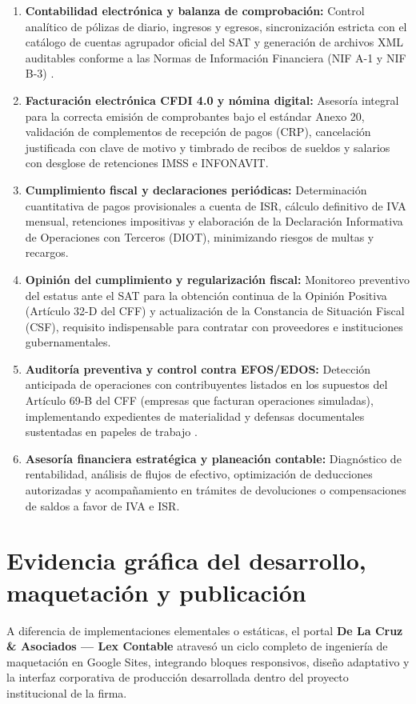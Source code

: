 {\begin{enumerate}
\item \textbf{Contabilidad electrónica y balanza de comprobación:} Control analítico de pólizas de diario, ingresos y egresos, sincronización estricta con el catálogo de cuentas agrupador oficial del SAT y generación de archivos XML auditables conforme a las Normas de Información Financiera (NIF A-1 y NIF B-3) \parencite{satPortalContabilidad}.
\item \textbf{Facturación electrónica CFDI 4.0 y nómina digital:} Asesoría integral para la correcta emisión de comprobantes bajo el estándar Anexo 20, validación de complementos de recepción de pagos (CRP), cancelación justificada con clave de motivo y timbrado de recibos de sueldos y salarios con desglose de retenciones IMSS e INFONAVIT.
\item \textbf{Cumplimiento fiscal y declaraciones periódicas:} Determinación cuantitativa de pagos provisionales a cuenta de ISR, cálculo definitivo de IVA mensual, retenciones impositivas y elaboración de la Declaración Informativa de Operaciones con Terceros (DIOT), minimizando riesgos de multas y recargos.
\item \textbf{Opinión del cumplimiento y regularización fiscal:} Monitoreo preventivo del estatus ante el SAT para la obtención continua de la Opinión Positiva (Artículo 32-D del CFF) y actualización de la Constancia de Situación Fiscal (CSF), requisito indispensable para contratar con proveedores e instituciones gubernamentales.
\item \textbf{Auditoría preventiva y control contra EFOS/EDOS:} Detección anticipada de operaciones con contribuyentes listados en los supuestos del Artículo 69-B del CFF (empresas que facturan operaciones simuladas), implementando expedientes de materialidad y defensas documentales sustentadas en papeles de trabajo \parencite{lexContablePortal}.
\item \textbf{Asesoría financiera estratégica y planeación contable:} Diagnóstico de rentabilidad, análisis de flujos de efectivo, optimización de deducciones autorizadas y acompañamiento en trámites de devoluciones o compensaciones de saldos a favor de IVA e ISR.
\end{enumerate}

\section{Evidencia gráfica del desarrollo, maquetación y publicación}
A diferencia de implementaciones elementales o estáticas, el portal \textbf{De La Cruz \& Asociados --- Lex Contable} atravesó un ciclo completo de ingeniería de maquetación en Google Sites, integrando bloques responsivos, diseño adaptativo y la interfaz corporativa de producción desarrollada dentro del proyecto institucional de la firma.

}
